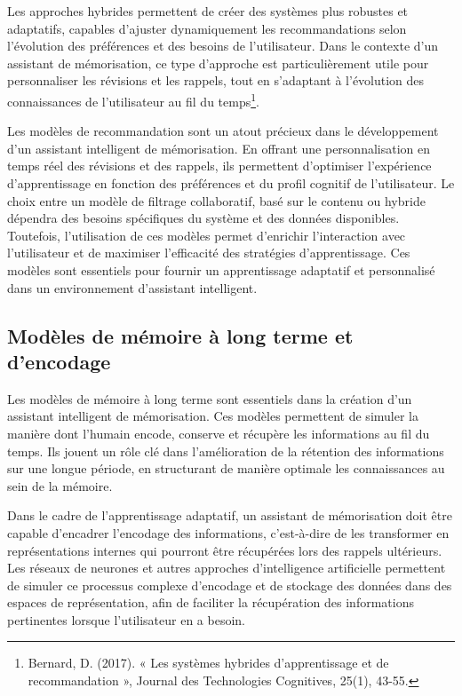 \documentclass[11pt,a4paper]{report}
\begin{document}
Les approches hybrides permettent de créer des systèmes plus robustes et adaptatifs, capables d’ajuster dynamiquement les recommandations selon l’évolution des préférences et des besoins de l’utilisateur. Dans le contexte d’un assistant de mémorisation, ce type d’approche est particulièrement utile pour personnaliser les révisions et les rappels, tout en s’adaptant à l’évolution des connaissances de l’utilisateur au fil du temps\footnote{Bernard, D. (2017). « Les systèmes hybrides d’apprentissage et de recommandation », Journal des Technologies Cognitives, 25(1), 43-55.}.

Les modèles de recommandation sont un atout précieux dans le développement d’un assistant intelligent de mémorisation. En offrant une personnalisation en temps réel des révisions et des rappels, ils permettent d'optimiser l’expérience d’apprentissage en fonction des préférences et du profil cognitif de l’utilisateur. Le choix entre un modèle de filtrage collaboratif, basé sur le contenu ou hybride dépendra des besoins spécifiques du système et des données disponibles. Toutefois, l'utilisation de ces modèles permet d’enrichir l’interaction avec l’utilisateur et de maximiser l’efficacité des stratégies d’apprentissage. Ces modèles sont essentiels pour fournir un apprentissage adaptatif et personnalisé dans un environnement d’assistant intelligent.

\subsection{Modèles de mémoire à long terme et d'encodage}

Les modèles de mémoire à long terme sont essentiels dans la création d’un assistant intelligent de mémorisation. Ces modèles permettent de simuler la manière dont l'humain encode, conserve et récupère les informations au fil du temps. Ils jouent un rôle clé dans l'amélioration de la rétention des informations sur une longue période, en structurant de manière optimale les connaissances au sein de la mémoire.

Dans le cadre de l’apprentissage adaptatif, un assistant de mémorisation doit être capable d’encadrer l’encodage des informations, c'est-à-dire de les transformer en représentations internes qui pourront être récupérées lors des rappels ultérieurs. Les réseaux de neurones et autres approches d'intelligence artificielle permettent de simuler ce processus complexe d'encodage et de stockage des données dans des espaces de représentation, afin de faciliter la récupération des informations pertinentes lorsque l’utilisateur en a besoin.
\end{document}
